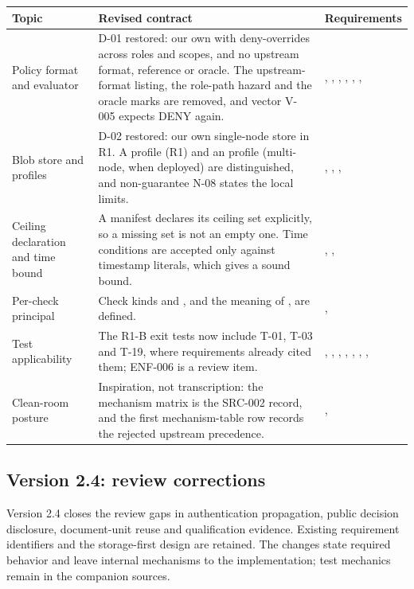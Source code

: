 \begin{longtable}{@{}P{0.23\textwidth}P{0.48\textwidth}P{0.19\textwidth}@{}}
\toprule Topic & Revised contract & Requirements\\\midrule\endhead
Policy format and evaluator & D-01 restored: our own  with deny-overrides across roles and scopes, and no upstream format, reference or oracle. The upstream-format listing, the role-path hazard and the oracle marks are removed, and vector V-005 expects DENY again. & , , , , , , \\
Blob store and profiles & D-02 restored: our own single-node store in R1. A  profile (R1) and an  profile (multi-node, when deployed) are distinguished, and non-guarantee N-08 states the local limits. & , , , \\
Ceiling declaration and time bound & A manifest declares its ceiling set explicitly, so a missing set is not an empty one. Time conditions are accepted only against timestamp literals, which gives a sound  bound. & , , \\
Per-check principal & Check kinds  and , and the meaning of , are defined. & , \\
Test applicability & The R1-B exit tests now include T-01, T-03 and T-19, where requirements already cited them; ENF-006 is a review item. & , , , , , , , \\
Clean-room posture & Inspiration, not transcription: the mechanism matrix is the SRC-002 record, and the first mechanism-table row records the rejected upstream precedence. & , \\
\bottomrule
\end{longtable}


\subsection{Version 2.4: review corrections}
Version 2.4 closes the review gaps in authentication propagation, public decision disclosure, document-unit reuse and qualification evidence. Existing requirement identifiers and the storage-first design are retained. The changes state required behavior and leave internal mechanisms to the implementation; test mechanics remain in the companion sources.

